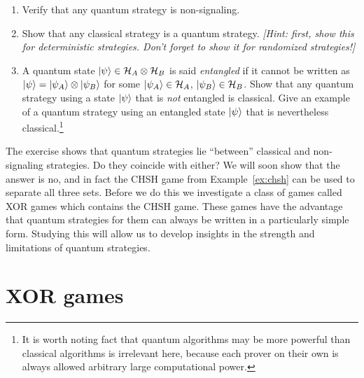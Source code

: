 \begin{exercise}
\begin{enumerate}
\item Verify that any quantum strategy is non-signaling.
\item Show that any classical strategy is a quantum strategy. \emph{[Hint: first, show this for deterministic strategies. Don't forget to show it for randomized strategies!]}
\item A quantum state $|\psi\rangle\in \mathcal{H}_A\otimes \mathcal{H}_B$ is said \emph{entangled} if it cannot be written as $|\psi\rangle=|\psi_A\rangle\otimes |\psi_B\rangle$ for some $|\psi_A\rangle\in\mathcal{H}_A$, $|\psi_B\rangle\in \mathcal{H}_B$. Show that any quantum strategy using a state $|\psi\rangle$ that is \emph{not} entangled is classical. Give an example of a quantum strategy using an entangled state $|\psi\rangle$ that is nevertheless classical.\footnote{It is worth noting fact that quantum algorithms may be more powerful than classical algorithms is irrelevant here, because each prover on their own is always allowed arbitrary large computational power.}
\end{enumerate}
\end{exercise}

The exercise shows that quantum strategies lie ``between'' classical and non-signaling strategies. Do they coincide with either? We will soon show that the answer is no, and in fact the CHSH game from Example~\ref{ex:chsh} can be used to separate all three sets. Before we do this we investigate a class of games called XOR games which contains the CHSH game. These games have the advantage that quantum strategies for them can always be written in a particularly simple form. Studying this will allow us to develop insights in the strength and limitations of quantum strategies. 



\section{XOR games}

